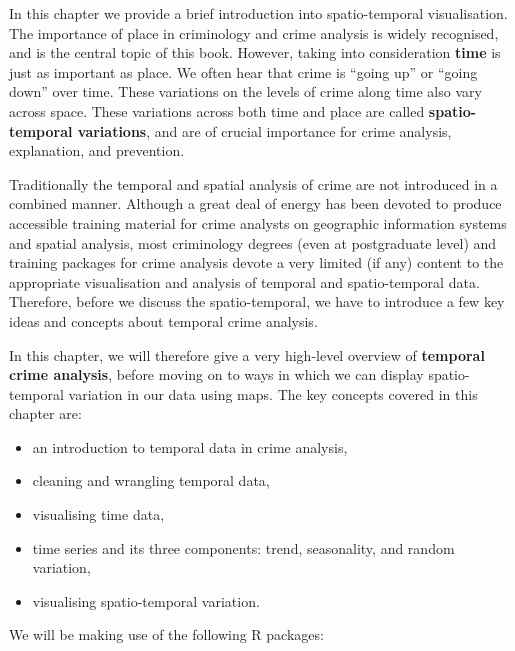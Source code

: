 \documentclass[
  krantz2]{krantz}
\providecommand{\tightlist}{%
  \setlength{\itemsep}{0pt}\setlength{\parskip}{0pt}}
\begin{document}
In this chapter we provide a brief introduction into spatio-temporal visualisation. The importance of place in criminology and crime analysis is widely recognised, and is the central topic of this book. However, taking into consideration \textbf{time} is just as important as place. We often hear that crime is ``going up'' or ``going down'' over time. These variations on the levels of crime along time also vary across space. These variations across both time and place are called \textbf{spatio-temporal variations}, and are of crucial importance for crime analysis, explanation, and prevention.

Traditionally the temporal and spatial analysis of crime are not introduced in a combined manner. Although a great deal of energy has been devoted to produce accessible training material for crime analysts on geographic information systems and spatial analysis, most criminology degrees (even at postgraduate level) and training packages for crime analysis devote a very limited (if any) content to the appropriate visualisation and analysis of temporal and spatio-temporal data. Therefore, before we discuss the spatio-temporal, we have to introduce a few key ideas and concepts about temporal crime analysis.

In this chapter, we will therefore give a very high-level overview of \textbf{temporal crime analysis}, before moving on to ways in which we can display spatio-temporal variation in our data using maps. The key concepts covered in this chapter are:

\begin{itemize}
\tightlist
\item
  an introduction to temporal data in crime analysis,
\item
  cleaning and wrangling temporal data,
\item
  visualising time data,
\item
  time series and its three components: trend, seasonality, and random variation,
\item
  visualising spatio-temporal variation.
\end{itemize}

We will be making use of the following R packages:
\end{document}
